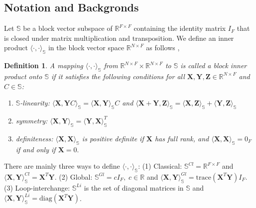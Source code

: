 \documentclass{article}
\newcommand\ie{\textit{i.e.}}
\newtheorem{definition}{Definition}
\begin{document}
\subsection{Notation and Backgronds}
Let $\mathbb{S}$ be a block vector subspace of $\mathbb{R}^{F\times F}$ containing the identity matrix $I_F$ that is closed under matrix multiplication and transposition. We define an inner product $\langle\cdot, \cdot\rangle_{\mathbb{S}}$ in the block vector space $\mathbb{R}^{N \times F}$ as follows \cite{frommer2017block},
\begin{definition}
A mapping $\langle\cdot, \cdot\rangle_{\mathbb{S}}$ from $\mathbb{R}^{N\times F} \times \mathbb{R}^{N\times F}$ to $\mathbb{S} $ is called a block inner product onto $\mathbb{S}$ if it satisfies the following conditions for all $\bm{X, Y, Z} \in \mathbb{R}^{N\times F}$ and $C \in \mathbb{S}$:
\begin{enumerate}[leftmargin=12pt]
\item $\mathbb{S}$-linearity: $\langle \bm{X}, \bm{Y}C \rangle_{\mathbb{S}} =  \langle \bm{X}, \bm{Y}\rangle_{\mathbb{S}}C$  and $ \langle \bm{X} + \bm{Y}, \bm{Z} \rangle_{\mathbb{S}} = \langle\bm{X}, \bm{Z}\rangle_{\mathbb{S}} + \langle \bm{Y}, \bm{Z}\rangle_{\mathbb{S}}$
\item symmetry: $ \langle \bm{X}, \bm{Y}\rangle_{\mathbb{S}} = \langle\bm{Y}, \bm{X}\rangle_{\mathbb{S}}^T $
\item definiteness: $ \langle \bm{X}, \bm{X}\rangle_{\mathbb{S}} $ is positive definite if $\bm{X}$ has full rank, and $ \langle \bm{X}, \bm{X}\rangle_{\mathbb{S}} = 0_F$ if and only if $\bm{X} = 0.$
\end{enumerate}
\end{definition}
	
There are mainly three ways to define $\langle\cdot, \cdot\rangle_{\mathbb{S}}$: (1) Classical: $\mathbb{S}^{Cl} = \mathbb{R}^{F\times F}$  and $ \langle \bm{X}, \bm{Y}\rangle_{\mathbb{S}}^{Cl}= \bm{X}^{T} \bm{Y}$. (2) Global: $\mathbb{S}^{Gl} = c I_F,\; c \in \mathbb{R} $   and $ \langle \bm{X}, \bm{Y}\rangle_{\mathbb{S}}^{Gl}= \text{trace}(\bm{X}^T \bm{Y}) I_F $. (3) Loop-interchange: $\mathbb{S}^{Li}$ is the set of diagonal matrices in $\mathbb{S}$  and $ \langle \bm{X}, \bm{Y}\rangle_{\mathbb{S}}^{Li}= \text{diag}(\bm{X}^T \bm{Y}) $.
\end{document}
